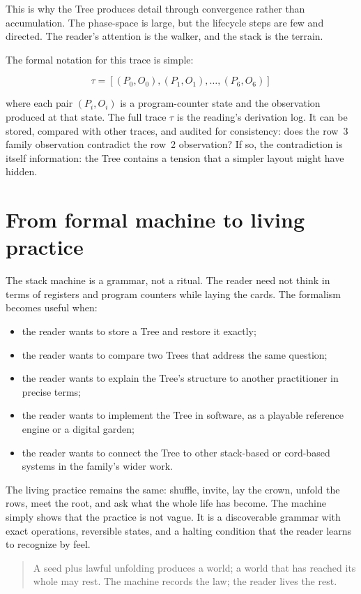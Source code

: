This is why the Tree produces detail through convergence rather than
accumulation. The phase-space is large, but the lifecycle steps are few and
directed. The reader's attention is the walker, and the stack is the terrain.

The formal notation for this trace is simple:

\[
\tau = [(P_0, O_0), (P_1, O_1), \dots, (P_6, O_6)]
\]

where each pair $(P_i, O_i)$ is a program-counter state and the observation
produced at that state. The full trace $\tau$ is the reading's derivation log.
It can be stored, compared with other traces, and audited for consistency:
does the row~3 family observation contradict the row~2 observation? If so, the
contradiction is itself information: the Tree contains a tension that a
simpler layout might have hidden.

\section{From formal machine to living practice}

The stack machine is a grammar, not a ritual. The reader need not think in
terms of registers and program counters while laying the cards. The formalism
becomes useful when:

\begin{itemize}
\item the reader wants to store a Tree and restore it exactly;
\item the reader wants to compare two Trees that address the same question;
\item the reader wants to explain the Tree's structure to another practitioner
      in precise terms;
\item the reader wants to implement the Tree in software, as a playable
      reference engine or a digital garden;
\item the reader wants to connect the Tree to other stack-based or cord-based
      systems in the family's wider work.
\end{itemize}

The living practice remains the same: shuffle, invite, lay the crown, unfold the
rows, meet the root, and ask what the whole life has become. The machine simply
shows that the practice is not vague. It is a discoverable grammar with exact
operations, reversible states, and a halting condition that the reader learns
to recognize by feel.

\begin{quote}
A seed plus lawful unfolding produces a world; a world that has reached its
whole may rest. The machine records the law; the reader lives the rest.
\end{quote}
